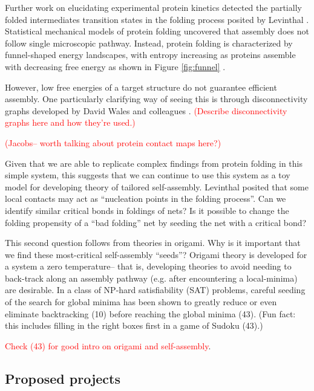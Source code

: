 Further work on elucidating experimental protein kinetics detected the partially folded intermediates transition states in the folding process posited by Levinthal \cite{Dill_2007_CurrOpinStructBio}. 
Statistical mechanical models of protein folding uncovered that assembly does not follow single microscopic pathway.
Instead, protein folding is characterized by funnel-shaped energy landscapes, with entropy increasing as proteins assemble with decreasing free energy as shown in Figure \ref{fig:funnel} \cite{Dill_1997_Nature}.

However, low free energies of a target structure do not guarantee efficient assembly.
One particularly clarifying way of seeing this is through disconnectivity graphs developed by David Wales and colleagues \cite{Wales_2017_JChemPhys}.
\textcolor{red}{(Describe disconnectivity graphs here and how they're used.)}

\textcolor{red}{(Jacobs-- worth talking about protein contact maps here?)}

Given that we are able to replicate complex findings from protein folding in this simple system, this suggests that we can continue to use this system as a toy model for developing theory of tailored self-assembly.
Levinthal posited that some local contacts may act as ``nucleation points in the folding process''.
Can we identify similar critical bonds in foldings of nets?
Is it possible to change the folding propensity of a ``bad folding'' net by seeding the net with a critical bond?

This second question follows from theories in origami. 
Why is it important that we find these most-critical self-assembly ``seeds''?
Origami theory is developed for a system a zero temperature-- that is, developing theories to avoid needing to back-track along an assembly pathway (e.g. after encountering a local-minima) are desirable.
In a class of NP-hard satisfiability (SAT) problems, careful seeding of the search for global minima has been shown to greatly reduce or even eliminate backtracking \cite{Stern_2017_arxiv}(10) before reaching the global minima \cite{Stern_2017_arxiv}(43).
(Fun fact: this includes filling in the right boxes first in a game of Sudoku \cite{Stern_2017_arxiv}(43).) 

\textcolor{red}{Check \cite{Stern_2017_arxiv}(43) for good intro on origami and self-assembly}.

\subsection{Proposed projects}

